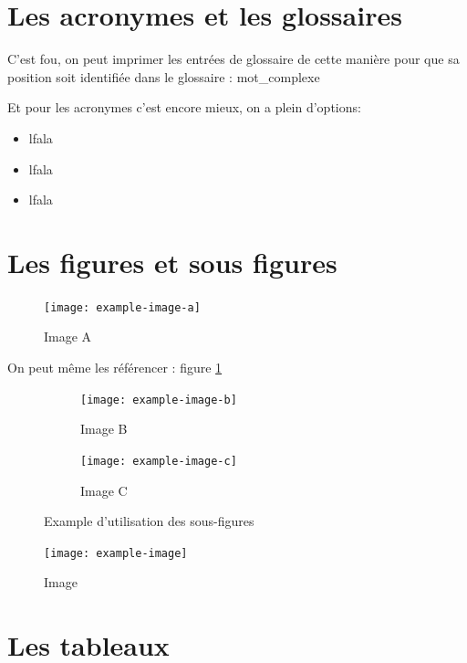 \documentclass[a4paper,11pt]{report}    %
\begin{document}
\section{Les acronymes et les glossaires}

C'est fou, on peut imprimer les entrées de glossaire de cette manière pour que sa position soit identifiée dans le glossaire : \gls{mot_complexe}

Et pour les acronymes c'est encore mieux, on a plein d'options:
\begin{itemize}
    \item \acrshort{lfala}
        \item \acrlong{lfala}
    \item \acrfull{lfala}
\end{itemize}

\section{Les figures et sous figures}

\begin{figure}[H]
    \centering
    \texttt{[image: example-image-a]}
    \caption{Image A}
    \label{fig:example-image-a}
\end{figure}

On peut même les référencer : figure \ref{fig:example-image-a}

\begin{figure}[H]
    \begin{subfigure}[t]{0.475\textwidth}
        \texttt{[image: example-image-b]}
        \caption{Image B}
        \label{subfig:example-image-b}
    \end{subfigure}%
    \hfill
    \begin{subfigure}[t]{0.475\textwidth}
        \texttt{[image: example-image-c]}
        \caption{Image C}
        \label{subfig:example-image-c}
    \end{subfigure}
    \caption{Example d'utilisation des sous-figures}
    \label{fig:test_subfigure}
\end{figure}

\begin{figure}[H]
    \centering
    \texttt{[image: example-image]}
    \caption{Image}
    \label{fig:example-image}
\end{figure}

\section{Les tableaux}
\end{document}
